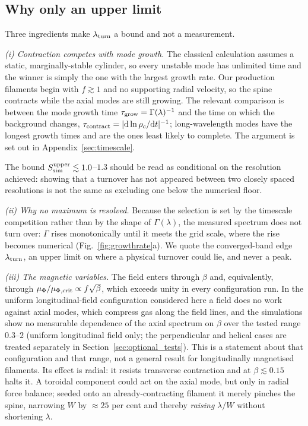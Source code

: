 \documentclass[usenatbib,twoside,twocolumn]{mnras}
\begin{document}
\subsection{Why only an upper limit}
\label{sec:whyupper}


Three ingredients make $\lambda_{\rm turn}$ a bound and not a measurement.

\emph{(i) Contraction competes with mode growth.} The classical calculation assumes a static, marginally-stable cylinder, so every unstable mode has unlimited time and the winner is simply the one with the largest growth rate. Our production filaments begin with $f\gtrsim1$ and no supporting radial velocity, so the spine contracts while the axial modes are still growing. The relevant comparison is between the mode growth time $\tau_{\rm grow}=\Gamma(\lambda)^{-1}$ and the time on which the background changes, $\tau_{\rm contract}=|{\rm d}\ln\rho_c/{\rm d}t|^{-1}$; long-wavelength modes have the longest growth times and are the ones least likely to complete. The argument is set out in Appendix~\ref{sec:timescale}.

The bound $S_{\rm sim}^{\rm upper}\lesssim1.0$--$1.3$ should be read as conditional on the resolution achieved: showing that a turnover has not appeared between two closely spaced resolutions is not the same as excluding one below the numerical floor.

\emph{(ii) Why no maximum is resolved.} Because the selection is set by the timescale competition rather than by the shape of $\Gamma(\lambda)$, the measured spectrum does not turn over: $\Gamma$ rises monotonically until it meets the grid scale, where the rise becomes numerical (Fig.~\ref{fig:growthrate}a). We quote the converged-band edge $\lambda_{\rm turn}$, an upper limit on where a physical turnover could lie, and never a peak.

\emph{(iii) The magnetic variables.} The field enters through $\beta$ and, equivalently, through $\mu_\Phi/\mu_{\Phi,\rm crit}\propto f\sqrt{\beta}$, which exceeds unity in every configuration run. In the uniform longitudinal-field configuration considered here a field does no work against axial modes, which compress gas along the field lines, and the simulations show no measurable dependence of the axial spectrum on $\beta$ over the tested range $0.3$--$2$ (uniform longitudinal field only; the perpendicular and helical cases are treated separately in Section~\ref{sec:optional_tests}). This is a statement about that configuration and that range, not a general result for longitudinally magnetised filaments. Its effect is radial: it resists transverse contraction and at $\beta\lesssim0.15$ halts it. A toroidal component could act on the axial mode, but only in radial force balance; seeded onto an already-contracting filament it merely pinches the spine, narrowing $W$ by $\approx25$ per cent and thereby \emph{raising} $\lambda/W$ without shortening $\lambda$.
\end{document}
